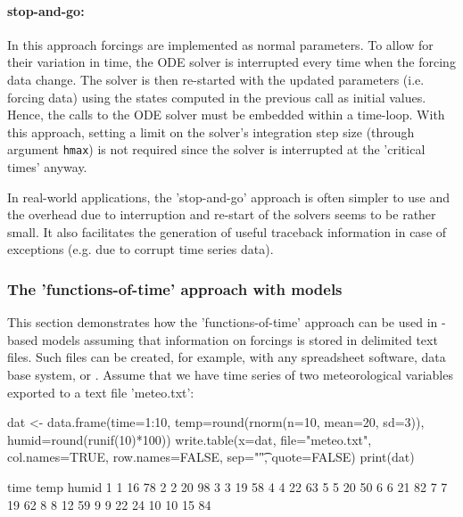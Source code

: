 \documentclass[onecolumn]{article}
\begin{document}
\paragraph{stop-and-go:} In this approach forcings are implemented as normal parameters. To allow for their variation in time, the ODE solver is interrupted every time when the forcing data change. The solver is then re-started with the updated parameters (i.e. forcing data) using the states computed in the previous call as initial values. Hence, the calls to the ODE solver must be embedded within a time-loop. With this approach, setting a limit on the solver's integration step size (through argument \verb|hmax|) is not required since the solver is interrupted at the 'critical times' anyway.

In real-world applications, the 'stop-and-go' approach is often simpler to use and the overhead due to interruption and re-start of the solvers seems to be rather small. It also facilitates the generation of useful traceback information in case of exceptions (e.g. due to corrupt time series data).

\subsubsection{The 'functions-of-time' approach with  models}

This section demonstrates how the 'functions-of-time' approach can be used in -based models assuming that information on forcings is stored in delimited text files. Such files can be created, for example, with any spreadsheet software, data base system, or . Assume that we have time series of two meteorological variables exported to a text file 'meteo.txt':

\begin{Schunk}
\begin{Sinput}
 dat <- data.frame(time=1:10, temp=round(rnorm(n=10, mean=20, sd=3)),
   humid=round(runif(10)*100))
 write.table(x=dat, file="meteo.txt", col.names=TRUE,
   row.names=FALSE, sep="\t", quote=FALSE)
 print(dat)
\end{Sinput}
\begin{Soutput}
   time temp humid
1     1   16    78
2     2   20    98
3     3   19    58
4     4   22    63
5     5   20    50
6     6   21    82
7     7   19    62
8     8   12    59
9     9   22    24
10   10   15    84
\end{Soutput}
\end{Schunk}
\end{document}
